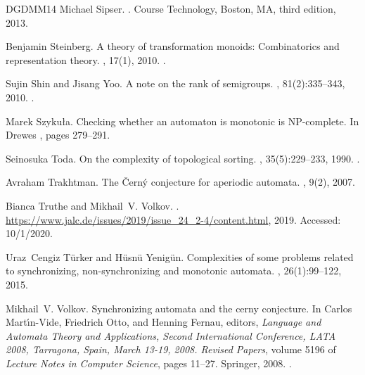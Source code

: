 \documentclass[11pt,a4paper]{amsart}
\theoremstyle{plain}
\theoremstyle{definition}
\theoremstyle{defC}
\theoremstyle{thmC}
\theoremstyle{plain}
\numberwithin{equation}{section}
\begin{document}
\begin{thebibliography}{DGDMM14}
Michael Sipser.
.
\newblock Course Technology, Boston, MA, third edition, 2013.

Benjamin Steinberg.
\newblock A theory of transformation monoids: Combinatorics and representation
  theory.
, 17(1), 2010.
\newblock \href {https://doi.org/10.37236/436} {}.

Sujin Shin and Jisang Yoo.
\newblock A note on the rank of semigroups.
, 81(2):335--343, 2010.
\newblock \href {https://doi.org/10.1007/s00233-010-9225-2}
  {}.

Marek Szyku{\l}a.
\newblock Checking whether an automaton is monotonic is {NP}-complete.
\newblock In Drewes \cite{DBLP:conf/wia/2015}, pages 279--291.

Seinosuka Toda.
\newblock On the complexity of topological sorting.
, 35(5):229--233, 1990.
\newblock \href {https://doi.org/10.1016/0020-0190(90)90050-8}
  {}.

Avraham Trakhtman.
\newblock The {{\v{C}}ern{\'{y}}} conjecture for aperiodic automata.
, 9(2),
  2007.

Bianca Truthe and Mikhail~V. Volkov.
.
\newblock \url{https://www.jalc.de/issues/2019/issue\_24\_2-4/content.html},
  2019.
\newblock Accessed: 10/1/2020.

Uraz~Cengiz T{\"{u}}rker and H{\"{u}}sn{\"{u}} Yenig{\"{u}}n.
\newblock Complexities of some problems related to synchronizing,
  non-synchronizing and monotonic automata.
,
  26(1):99--122, 2015.

Mikhail~V. Volkov.
\newblock Synchronizing automata and the cerny conjecture.
\newblock In Carlos Mart{\'{\i}}n{-}Vide, Friedrich Otto, and Henning Fernau,
  editors, {\em Language and Automata Theory and Applications, Second
  International Conference, {LATA} 2008, Tarragona, Spain, March 13-19, 2008.
  Revised Papers}, volume 5196 of {\em Lecture Notes in Computer Science},
  pages 11--27. Springer, 2008.
\newblock \href {https://doi.org/10.1007/978-3-540-88282-4\_4}
  {}.


\end{thebibliography}
\end{document}

